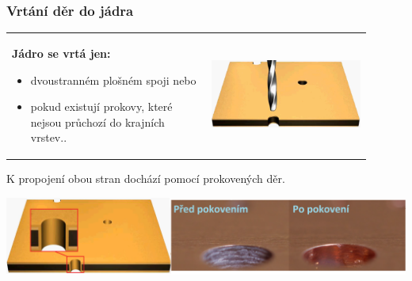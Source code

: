 \documentclass{beamer}
\begin{document}
\begin{frame}
	\frametitle{Vrtání děr do jádra}

	\begin{center}
		\begin{tabular}{m{0.5\linewidth} m{0.4\linewidth}}
		\textbf{Jádro se vrtá jen:}
		\begin{itemize}
			\item dvoustranném plošném spoji nebo
			\item pokud existují prokovy, které nejsou průchozí do krajních vrstev..
		\end{itemize}
		 & \includegraphics[scale=0.12]{jadroVrtani.png}
		\end{tabular}
	\end{center}
	
	K propojení obou stran dochází pomocí prokovených děr.
	\begin{center}
	\includegraphics[scale=0.14]{jadroProkovy.png}
	\end{center}
\end{frame}
\end{document}
